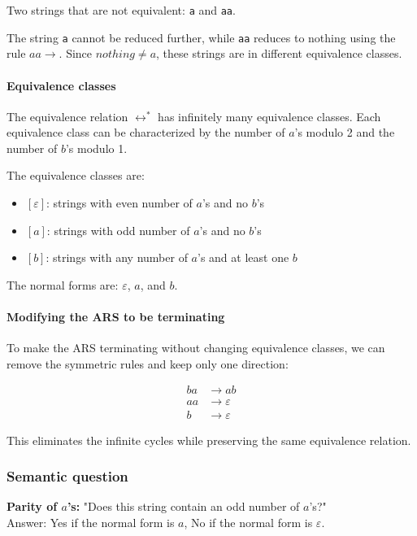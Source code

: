 \documentclass{article}
\theoremstyle{theorem}
\theoremstyle{definition}
\theoremstyle{remark}
\begin{document}
Two strings that are not equivalent: \texttt{a} and \texttt{aa}. 

The string \texttt{a} cannot be reduced further, while \texttt{aa} reduces to nothing using the rule $aa \rightarrow $. Since $nothing \neq a$, these strings are in different equivalence classes.

\paragraph{Equivalence classes}

The equivalence relation $\leftrightarrow^*$ has infinitely many equivalence classes. Each equivalence class can be characterized by the number of $a$'s modulo 2 and the number of $b$'s modulo 1.

The equivalence classes are:
\begin{itemize}
\item $[\varepsilon]$: strings with even number of $a$'s and no $b$'s
\item $[a]$: strings with odd number of $a$'s and no $b$'s  
\item $[b]$: strings with any number of $a$'s and at least one $b$
\end{itemize}

The normal forms are: $\varepsilon$, $a$, and $b$.

\paragraph{Modifying the ARS to be terminating}

To make the ARS terminating without changing equivalence classes, we can remove the symmetric rules and keep only one direction:

\begin{align*}
ba &\rightarrow ab \\
aa &\rightarrow \varepsilon \\
b &\rightarrow \varepsilon
\end{align*}

This eliminates the infinite cycles while preserving the same equivalence relation.

\subsubsection{Semantic question}


\textbf{Parity of $a$'s:} "Does this string contain an odd number of $a$'s?" \\
Answer: Yes if the normal form is $a$, No if the normal form is $\varepsilon$.
\end{document}
